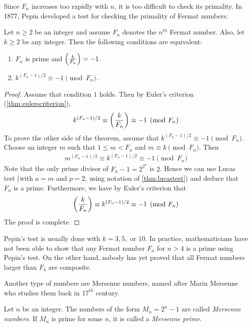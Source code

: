 Since $F_n$ increases too rapidly with $n$, it is too difficult to check its primality. In 1877, Pepin developed a test for checking the primality of Fermat numbers:

	\begin{theorem}
		Let $n \geq 2$ be an integer and assume $F_n$ denotes the $n^{th}$ Fermat number. Also, let $k \geq 2$ be any integer. Then the following conditions are equivalent:
			\begin{enumerate}[1.]
				\item $F_n$ is prime and $\left(\frac{k}{F_n}\right)=-1$.
				\item $k^{(F_n-1)/2} \equiv -1 \pmod{F_n}$.
			\end{enumerate}
	\end{theorem}

	\begin{proof}
		Assume that condition $1$ holds. Then by Euler's criterion (\autoref{thm:eulerscriterion}),
			\begin{align*}
				k^{(F_n-1)/2} \equiv \left(\dfrac{k}{F_n}\right) \equiv -1 \pmod{F_n}
			\end{align*}
		To prove the other side of the theorem, assume that $k^{(F_n-1)/2} \equiv -1 \pmod{F_n}$. Choose an integer $m$ such that $1 \leq  m <F_n$ and $m \equiv k \pmod{F_n}$. Then
			\begin{align*}
				m^{(F_n-1)/2} \equiv k^{(F_n-1)/2} \equiv -1 \pmod{F_n}
			\end{align*}
		Note that the only prime divisor of $F_n-1 = 2^{2^n}$ is $2$. Hence we can use Lucas test (with $a=m$ and $p=2$, using notation of \autoref{thm:lucastest}) and deduce that $F_n$ is a prime. Furthermore, we have by Euler's criterion that
			\begin{align*}
				\left(\dfrac{k}{F_n}\right) \equiv	k^{(F_n-1)/2}  \equiv -1 \pmod{F_n}
			\end{align*}
		The proof is complete.
	\end{proof}

Pepin's test is usually done with $k=3, 5,$ or $10$. In practice, mathematicians have not been able to show that any Fermat number $F_n$ for $n>4$ is a prime using Pepin's test. On the other hand, nobody has yet proved that all Fermat numbers larger than $F_4$ are composite.

Another type of numbers are Mersenne numbers, named after Marin Mersenne who studies them back in $17^{th}$ century.
	\begin{definition}
		Let $n$ be an integer. The numbers of the form $M_n = 2^n -1$ are called \textit{Mersenne numbers}. If $M_n$ is prime for some $n$, it is called a \textit{Mersenne prime}.
	\end{definition}

